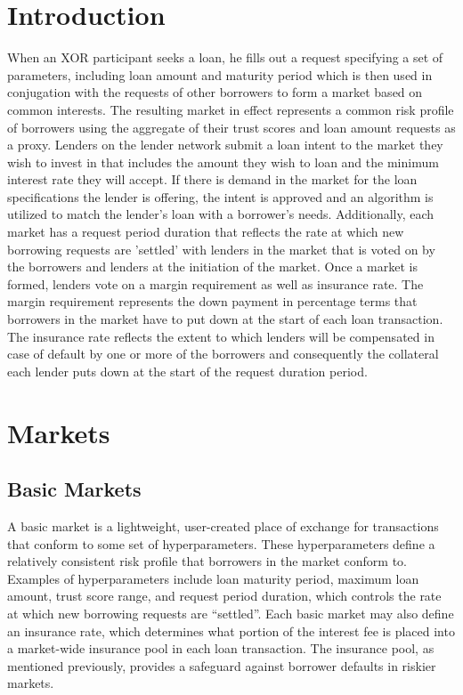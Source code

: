 \documentclass[twoside]{article}
\begin{document}
\section{Introduction}
When an XOR participant seeks a loan, he fills out a request specifying a set of parameters, including loan amount and maturity period which is then used in conjugation with the requests of other borrowers to form a market based on common interests. The resulting market in effect represents a common risk profile of borrowers using the aggregate of their trust scores and loan amount requests as a proxy. Lenders on the lender network submit a loan intent to the market they wish to invest in that includes the amount they wish to loan and the minimum interest rate they will accept. If there is demand in the market for the loan specifications the lender is offering, the intent is approved and an algorithm is utilized to match the lender’s loan with a borrower’s needs.
Additionally, each market has a  request period duration that reflects the rate at which new borrowing requests are 'settled' with lenders in the market that is voted on by the borrowers and lenders at the initiation of the market. Once a market is formed, lenders vote on a margin requirement as well as insurance rate. The margin requirement represents the down payment in percentage terms that borrowers in the market have to put down at the start of each loan transaction. The insurance rate reflects the extent to which lenders will be compensated in case of default by one or more of the borrowers and consequently the collateral each lender puts down at the start of the request duration period.

\section{Markets}
\subsection{Basic Markets}
A basic market is a lightweight, user-created place of exchange for transactions that conform to some set of hyperparameters. These hyperparameters define a relatively consistent risk profile that borrowers in the market conform to. Examples of hyperparameters include loan maturity period, maximum loan amount, trust score range, and request period duration, which controls the rate at which new borrowing requests are “settled”. Each basic market may also define an insurance rate, which determines what portion of the interest fee is placed into a market-wide insurance pool in each loan transaction. The insurance pool, as mentioned previously, provides a safeguard against borrower defaults in riskier markets.
\end{document}
